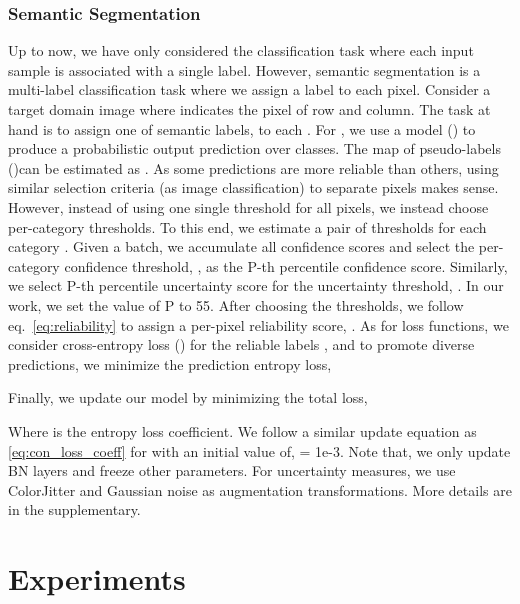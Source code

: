 \documentclass[10pt,twocolumn,letterpaper]{article}
\begin{document}
\subsubsection{Semantic Segmentation}
\vspace{-1mm}
Up to now, we have only considered the classification task where each input sample is associated with a single label. However, semantic segmentation is a multi-label classification task where we assign a label to each pixel. Consider a target domain image  where  indicates the pixel of  row and  column. The task at hand is to assign one of  semantic labels,  to each . For , we use a model () to produce a probabilistic output prediction  over  classes. The map of pseudo-labels ()can be estimated as . As some predictions are more reliable than others, using similar selection criteria (as image classification) to separate pixels makes sense. However, instead of using one single threshold for all pixels, we instead choose per-category thresholds. To this end, we estimate a pair of thresholds for each category . Given a batch, we accumulate all confidence scores and select the per-category confidence threshold, , as the P-th percentile confidence score. Similarly, we select P-th percentile uncertainty score for the uncertainty threshold, . In our work, we set the value of P to 55. After choosing the thresholds, we follow eq.~\ref{eq:reliability} to assign a per-pixel reliability score, . As for loss functions, we consider cross-entropy loss () for the reliable labels , and to promote diverse predictions, we minimize the prediction entropy loss,

Finally, we update our model by minimizing the total loss,

Where  is the entropy loss coefficient. We follow a similar update equation as \ref{eq:con_loss_coeff} for  with an initial value of,  = 1e-3. Note that, we only update BN layers and freeze other parameters. For uncertainty measures, we use ColorJitter and Gaussian noise as augmentation transformations. More details are in the supplementary.













\section{Experiments}
\label{sec:experiments}
\end{document}
